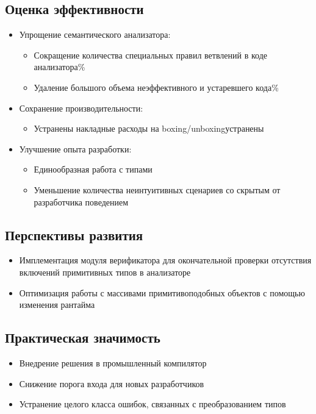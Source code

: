 \subsection{Оценка эффективности}
\begin{itemize}[leftmargin=*]
    \item Упрощение семантического анализатора:
    \begin{itemize}
        \item Сокращение количества специальных правил ветвлений в коде анализатора\%
        \item Удаление большого объема неэффективного и устаревшего кода\%
    \end{itemize}
    \item Сохранение производительности:
    \begin{itemize}
        \item Устранены накладные расходы на boxing/unboxingустранены
    \end{itemize}
    \item Улучшение опыта разработки:
    \begin{itemize}
        \item Единообразная работа с типами
        \item Уменьшение количества неинтуитивных сценариев со скрытым от разработчика поведением
    \end{itemize}
\end{itemize}

\subsection{Перспективы развития}
\begin{itemize}[leftmargin=*]
    \item Имплементация модуля верификатора для окончательной проверки отсутствия включений примитивных типов в анализаторе
    \item Оптимизация работы с массивами примитивоподобных объектов с помощью изменения рантайма
\end{itemize}

\subsection{Практическая значимость}
\begin{itemize}[leftmargin=*]
    \item Внедрение решения в промышленный компилятор
    \item Снижение порога входа для новых разработчиков
    \item Устранение целого класса ошибок, связанных с преобразованием типов
\end{itemize}

\begin{center}
\end{center}

\newpage
